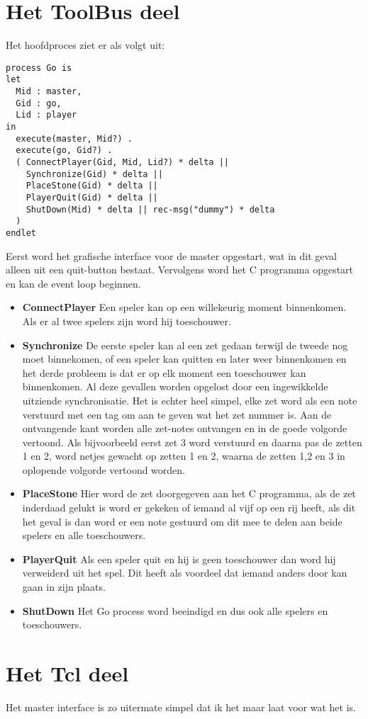 \section{Het ToolBus deel}
Het hoofdproces ziet er als volgt uit:
\begin{verbatim}
process Go is
let
  Mid : master,
  Gid : go,
  Lid : player
in
  execute(master, Mid?) .
  execute(go, Gid?) .
  ( ConnectPlayer(Gid, Mid, Lid?) * delta ||
    Synchronize(Gid) * delta ||
    PlaceStone(Gid) * delta ||
    PlayerQuit(Gid) * delta ||
    ShutDown(Mid) * delta || rec-msg("dummy") * delta
  )
endlet
\end{verbatim}
Eerst word het grafische interface voor de master opgestart, wat in dit
geval alleen uit een quit-button bestaat. Vervolgens word het C programma
opgestart en kan de event loop beginnen.
\begin{itemize}
\item{\bf ConnectPlayer} Een speler kan op een willekeurig moment
binnenkomen. Als er al twee spelers zijn word hij toeschouwer.
\item{\bf Synchronize} De eerste speler kan al een zet gedaan terwijl de
tweede nog moet binnekomen, of een speler kan quitten en later weer
binnenkomen en het derde probleem is dat er op elk moment een toeschouwer
kan binnenkomen. Al deze gevallen worden opgelost door een ingewikkelde
uitziende synchronisatie. Het is echter heel simpel, elke zet word
als een note verstuurd met een tag om aan te geven wat het zet nummer is.
Aan de ontvangende kant worden alle zet-notes ontvangen en in de goede
volgorde vertoond. Als bijvoorbeeld eerst zet 3 word verstuurd en daarna
pas de zetten 1 en 2, word netjes gewacht op zetten 1 en 2, waarna de
zetten 1,2 en 3 in oplopende volgorde vertoond worden.
\item{\bf PlaceStone} Hier word de zet doorgegeven aan het C programma,
als de zet inderdaad gelukt is word er gekeken of iemand al vijf op een
rij heeft, als dit het geval is dan word er een note gestuurd om dit
mee te delen aan beide spelers en alle toeschouwers.
\item{\bf PlayerQuit} Als een speler quit en hij is geen toeschouwer dan
word hij verweiderd uit het spel. Dit heeft als voordeel dat iemand anders
door kan gaan in zijn plaats.
\item{\bf ShutDown} Het Go process word beeindigd en dus ook alle spelers
en toeschouwers.
\end{itemize}

\section{Het Tcl deel}
Het master interface is zo uitermate simpel dat ik het maar laat voor wat
het is.


